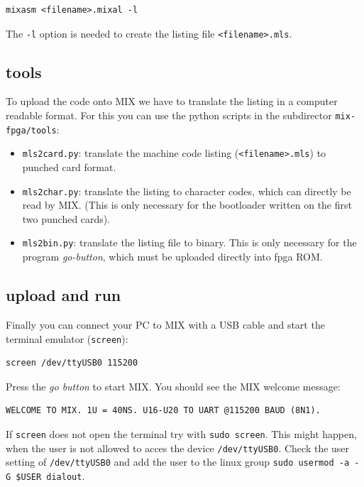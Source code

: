 \documentclass[a4paper,ngerman]{scrartcl}
\begin{document}
\begin{lstlisting}[numbers=none,frame=none]
mixasm <filename>.mixal -l
\end{lstlisting}

The \lstinline|-l| option is needed to create the listing file \lstinline|<filename>.mls|.


\subsection{tools}
To upload the code onto MIX we have to translate the listing in a computer readable format. For this you can use the python scripts in the subdirector \lstinline|mix-fpga/tools|:
\begin{itemize}
	\item \lstinline|mls2card.py|: translate the machine code listing (\lstinline|<filename>.mls|) to punched card format.
	\item  \lstinline|mls2char.py|: translate the listing to character codes, which can directly be read by MIX. (This is only necessary for the bootloader written on the first two punched cards).
	\item  \lstinline|mls2bin.py|: translate the listing file to binary. This is only necessary for the program \textit{go-button}, which must be uploaded directly into fpga ROM.
	 
\end{itemize}

\subsection{upload and run}
Finally you can connect your PC to MIX with a USB cable and start the  terminal emulator (\lstinline|screen|):
\begin{lstlisting}[numbers=none,frame=none]
screen /dev/ttyUSB0 115200
\end{lstlisting}
Press the \textit{go button} to start MIX. You should see the MIX welcome message:

\begin{lstlisting}
WELCOME TO MIX. 1U = 40NS. U16-U20 TO UART @115200 BAUD (8N1).        
\end{lstlisting}

If \lstinline|screen| does not open the terminal try with \lstinline|sudo screen|. This might happen, when the user is not allowed to acces the device \lstinline|/dev/ttyUSB0|. Check the user setting of \lstinline|/dev/ttyUSB0| and add the user to the linux group \lstinline|sudo usermod -a -G $USER dialout|.
\end{document}
